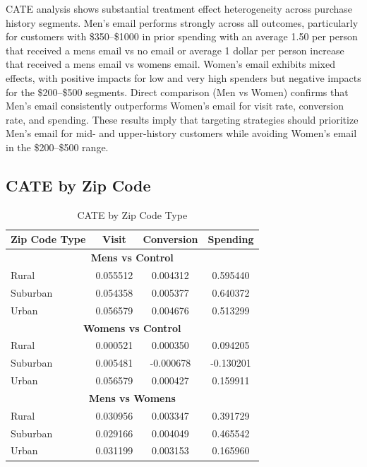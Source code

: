 \documentclass[10pt]{article}
\begin{document}
CATE analysis shows substantial treatment effect heterogeneity across purchase history segments. Men’s email performs strongly across all outcomes, particularly for customers with \$350–\$1000 in prior spending with an average 1.50 per person that received a mens email vs no email or average 1 dollar per person increase that received a mens email vs womens email. Women’s email exhibits mixed effects, with positive impacts for low and very high spenders but negative impacts for the \$200–\$500 segments. Direct comparison (Men vs Women) confirms that Men’s email consistently outperforms Women’s email for visit rate, conversion rate, and spending. These results imply that targeting strategies should prioritize Men’s email for mid- and upper-history customers while avoiding Women’s email in the \$200–\$500 range.

\subsection{CATE by Zip Code}

\begin{table}[H]
\centering
\caption{CATE by Zip Code Type}
\begin{tabular}{lccc}
\toprule
\textbf{Zip Code Type} & \textbf{Visit} & \textbf{Conversion} & \textbf{Spending} \\
\midrule
\multicolumn{4}{c}{\textbf{Mens vs Control}} \\
\midrule
Rural    & 0.055512 & 0.004312 & 0.595440 \\
Suburban & 0.054358 & 0.005377 & 0.640372 \\
Urban    & 0.056579 & 0.004676 & 0.513299 \\
\midrule
\multicolumn{4}{c}{\textbf{Womens vs Control}} \\
\midrule
Rural    & 0.000521 & 0.000350  & 0.094205 \\
Suburban & 0.005481 & -0.000678 & -0.130201 \\
Urban    & 0.056579 & 0.000427  & 0.159911 \\
\midrule
\multicolumn{4}{c}{\textbf{Mens vs Womens}} \\
\midrule
Rural    & 0.030956 & 0.003347 & 0.391729 \\
Suburban & 0.029166 & 0.004049 & 0.465542 \\
Urban    & 0.031199 & 0.003153 & 0.165960 \\
\bottomrule
\end{tabular}
\end{table}
\end{document}

